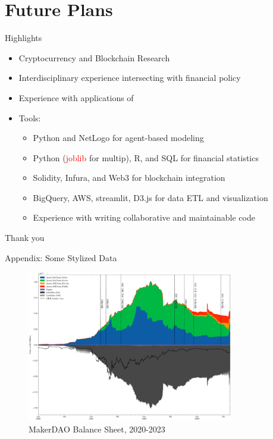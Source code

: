 \documentclass{beamer}
\begin{document}
\section{Future Plans}

\begin{frame}{Highlights}
\begin{itemize}
\item Cryptocurrency and Blockchain Research
\item Interdisciplinary experience intersecting with financial policy
\item Experience with applications of  
\item Tools: 
\begin{itemize}
    \item Python and NetLogo for agent-based modeling
    \item Python (\textcolor{red}{joblib} for multip), R, and SQL for financial statistics
    \item Solidity, Infura, and Web3 for blockchain integration
    \item BigQuery, AWS, streamlit, D3.js for data ETL and visualization
    \item Experience with writing collaborative and maintainable code 
\end{itemize}
\end{itemize}
\end{frame}




\begin{frame}{Thank you}

\end{frame}

\begin{frame}{Appendix: Some Stylized Data}
\begin{figure}
\centering
\includegraphics[width=90mm]{Figs/historical_balancesheet_with_votes.png}
\caption{MakerDAO Balance Sheet, 2020-2023}
\label{fig1}
\end{figure}
\end{frame}
\end{document}
